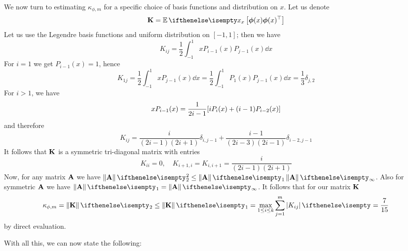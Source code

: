 We now turn to estimating $\kappa_{\phi, m}$ for a specific choice of basis
functions and distribution on $x$. Let us denote
\begin{equation}
  \Mat{K} = \Ev[x]{\Vec{\phi}(x) \Vec{\phi}(x)^\top}
\end{equation}
Let us use the Legendre basis functions and uniform distribution on $[-1, 1]$;
then we have
\begin{equation}
  K_{ij} = \frac{1}{2} \int_{-1}^1 x P_{i - 1}(x) P_{j - 1}(x) \dd{x}
\end{equation}
For $i = 1$ we get $P_{i - 1}(x) = 1$, hence
\begin{equation}
  K_{1j} = \frac{1}{2} \int_{-1}^1 x P_{j - 1}(x) \dd{x} = \frac{1}{2}
  \int_{-1}^1 P_1(x) P_{j - 1}(x) \dd{x} = \frac{1}{3} \delta_{j, 2}
\end{equation}
For $i > 1$, we have
\begin{equation}
  x P_{i - 1}(x) = \frac{1}{2 i - 1} \qty[i P_i(x) + (i - 1) P_{i - 2}(x)]
\end{equation}
and therefore
\begin{equation}
  K_{ij} = \frac{i}{(2 i - 1) (2 i + 1)} \delta_{i, j - 1} + \frac{i - 1}{(2 i -
  3) (2 i - 1)} \delta_{i - 2, j - 1}
\end{equation}
It follows that $\mathbf{K}$ is a symmetric tri-diagonal matrix with entries
\begin{equation}
  K_{ii} = 0, \quad K_{i + 1, i} = K_{i, i + 1} = \frac{i}{(2 i - 1) (2i + 1)}
\end{equation}
Now, for any matrix $\mathbf{A}$ we have $\Norm{\Mat{A}}_2^2 \leq \Norm{\Mat{A}}_1
\Norm{\Mat{A}}_\infty$. Also for symmetric $\mathbf{A}$ we have $\Norm{\Mat{A}}_1 =
\Norm{\Mat{A}}_\infty$. It follows that for our matrix $\mathbf{K}$
\begin{equation}
  \kappa_{\phi, m} = \Norm{\Mat{K}}_2 \leq \Norm{\Mat{K}}_1 = \max_{1 \leq i
  \leq k} \sum_{j = 1}^m \Abs{K_{ij}} = \frac{7}{15}
\end{equation}
by direct evaluation.

With all this, we can now state the following:

